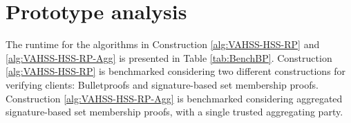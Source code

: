 \section{Prototype analysis}




The runtime for the algorithms in Construction \ref{alg:VAHSS-HSS-RP} and \ref{alg:VAHSS-HSS-RP-Agg} is presented in Table \ref{tab:BenchBP}. Construction \ref{alg:VAHSS-HSS-RP} is benchmarked considering two different constructions for verifying clients:  Bulletproofs and signature-based set membership proofs. Construction \ref{alg:VAHSS-HSS-RP-Agg} is benchmarked considering aggregated signature-based set membership proofs, with a single trusted aggregating party.
 




